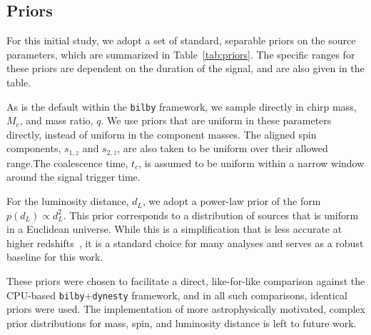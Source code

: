 \documentclass[fleqn,usenatbib]{mnras}
\begin{document}
\subsection{Priors}

For this initial study, we adopt a set of standard, separable priors on
the source parameters, which are summarized in Table~\ref{tab:priors}.
The specific ranges for these priors are dependent on the duration of the signal, and are
also given in the table.

As is the default within the \texttt{bilby} framework, we sample directly in chirp mass, $M_c$, and
mass ratio, $q$. We use priors that are uniform in these parameters directly, instead of uniform in the component masses. 
The aligned spin components, $s_{1,z}$ and $s_{2,z}$, are also taken to be uniform over
their allowed range.The coalescence time, $t_c$, is assumed to be uniform
within a narrow window around the signal trigger time.

For the luminosity distance, $d_L$, we adopt a power-law prior of the
form $p(d_L) \propto d_L^2$. This prior corresponds to a distribution of
sources that is uniform in a Euclidean universe. While this is a
simplification that is less accurate at higher redshifts~\citep{bilby_validation}, it is a
standard choice for many analyses and serves as a robust baseline for
this work.

These priors were chosen to facilitate a direct, like-for-like
comparison against the CPU-based \texttt{bilby}+\texttt{dynesty}
framework, and in all such comparisons, identical priors were used. The
implementation of more astrophysically motivated, complex prior
distributions for mass, spin, and luminosity distance is left to
future work.
\end{document}
